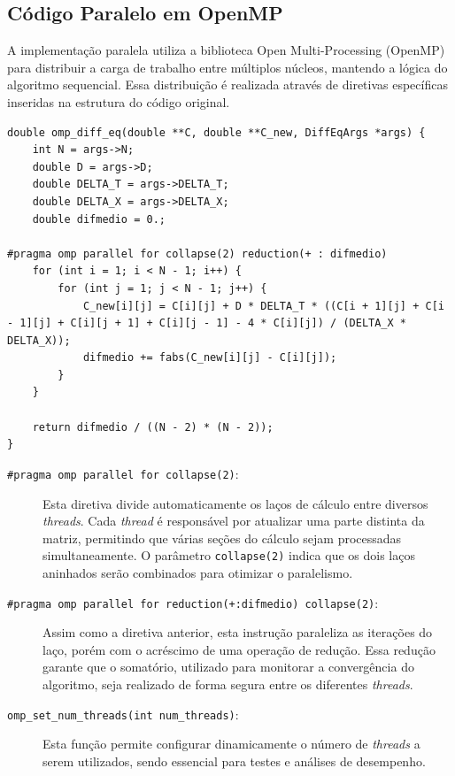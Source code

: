 \documentclass[12pt]{article}
\begin{document}
\subsection{Código Paralelo em OpenMP}

A implementação paralela utiliza a biblioteca Open Multi-Processing (OpenMP)
para distribuir a carga de trabalho entre múltiplos núcleos, mantendo a lógica
do algoritmo sequencial. Essa distribuição é realizada através de diretivas
específicas inseridas na estrutura do código original.

\begin{lstlisting}[style=CStyle, caption={Implementação paralelizada utilizando a biblioteca OpenMP.}, label={cod:omp}]
double omp_diff_eq(double **C, double **C_new, DiffEqArgs *args) {
    int N = args->N;
    double D = args->D;
    double DELTA_T = args->DELTA_T;
    double DELTA_X = args->DELTA_X;
    double difmedio = 0.;

#pragma omp parallel for collapse(2) reduction(+ : difmedio)
    for (int i = 1; i < N - 1; i++) {
        for (int j = 1; j < N - 1; j++) {
            C_new[i][j] = C[i][j] + D * DELTA_T * ((C[i + 1][j] + C[i - 1][j] + C[i][j + 1] + C[i][j - 1] - 4 * C[i][j]) / (DELTA_X * DELTA_X));
            difmedio += fabs(C_new[i][j] - C[i][j]);
        }
    }

    return difmedio / ((N - 2) * (N - 2));
}
\end{lstlisting}

\begin{description}
  \item[\texttt{\#pragma omp parallel for collapse(2)}:]
        Esta diretiva divide automaticamente os laços de cálculo entre diversos \textit{threads}. Cada \textit{thread} é responsável por atualizar uma parte distinta da matriz, permitindo que várias seções do cálculo sejam processadas simultaneamente. O parâmetro \texttt{collapse(2)} indica que os dois laços aninhados serão combinados para otimizar o paralelismo.

  \item[\texttt{\#pragma omp parallel for reduction(+:difmedio) collapse(2)}:]
        Assim como a diretiva anterior, esta instrução paraleliza as iterações do laço, porém com o acréscimo de uma operação de redução. Essa redução garante que o somatório, utilizado para monitorar a convergência do algoritmo, seja realizado de forma segura entre os diferentes \textit{threads}.

  \item[\texttt{omp\_set\_num\_threads(int num\_threads)}:]
        Esta função permite configurar dinamicamente o número de \textit{threads} a serem utilizados, sendo essencial para testes e análises de desempenho.
\end{description}
\end{document}

